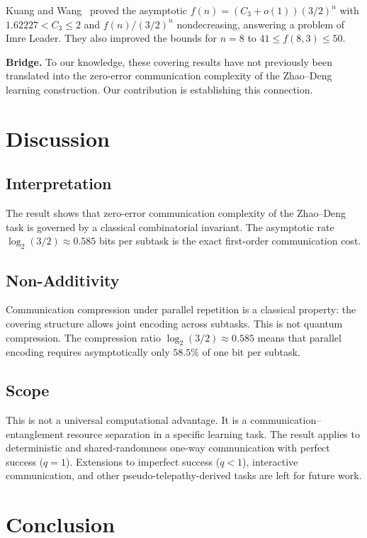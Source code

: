\documentclass[11pt,letterpaper]{article}
\begin{document}
Kuang and Wang~\cite{kuangwang2026} proved the asymptotic $f(n) = (C_3 + o(1))(3/2)^n$ with $1.62227 < C_3 \leq 2$ and $f(n)/(3/2)^n$ nondecreasing, answering a problem of Imre Leader. They also improved the bounds for $n=8$ to $41 \leq f(8,3) \leq 50$.

\textbf{Bridge.} To our knowledge, these covering results have not previously been translated into the zero-error communication complexity of the Zhao--Deng learning construction. Our contribution is establishing this connection.

\section{Discussion}
\label{sec:discussion}

\subsection{Interpretation}

The result shows that zero-error communication complexity of the Zhao--Deng task is governed by a classical combinatorial invariant. The asymptotic rate $\log_2(3/2) \approx 0.585$ bits per subtask is the exact first-order communication cost.

\subsection{Non-Additivity}

Communication compression under parallel repetition is a classical property: the covering structure allows joint encoding across subtasks. This is not quantum compression. The compression ratio $\log_2(3/2) \approx 0.585$ means that parallel encoding requires asymptotically only $58.5\%$ of one bit per subtask.

\subsection{Scope}

This is not a universal computational advantage. It is a communication--entanglement resource separation in a specific learning task. The result applies to deterministic and shared-randomness one-way communication with perfect success ($q=1$). Extensions to imperfect success ($q < 1$), interactive communication, and other pseudo-telepathy-derived tasks are left for future work.

\section{Conclusion}
\end{document}
